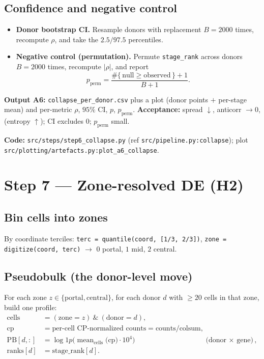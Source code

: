 \documentclass[11pt]{article}
\newcommand{\code}[1]{\texttt{\small #1}}
\begin{document}
\subsection{Confidence and negative control}
\begin{itemize}[leftmargin=1.4em]
  \item \textbf{Donor bootstrap CI.} Resample donors with replacement $B = 2000$ times, recompute
        $\rho$, and take the $2.5 / 97.5$ percentiles.
  \item \textbf{Negative control (permutation).} Permute \code{stage\_rank} across donors $B = 2000$
        times, recompute $|\rho|$, and report
        \[
          p_{\text{perm}} = \frac{\#\{\,\text{null} \ge \text{observed}\,\} + 1}{B + 1}.
        \]
\end{itemize}

\textbf{Output A6:} \code{collapse\_per\_donor.csv} plus a plot (donor points $+$ per-stage mean)
and per-metric $\rho$, $95\%$ CI, $p$, $p_{\text{perm}}$.
\textbf{Acceptance:} spread $\downarrow$, anticorr $\to 0$, (entropy $\uparrow$); CI excludes $0$;
$p_{\text{perm}}$ small.

\medskip
\noindent\textbf{Code:} \code{src/steps/step6\_collapse.py} (ref \code{src/pipeline.py:collapse});
plot \code{src/plotting/artefacts.py:plot\_a6\_collapse}.

\section{Step 7 --- Zone-resolved DE (H2)}

\subsection{Bin cells into zones}
By coordinate terciles: \code{terc = quantile(coord, [1/3, 2/3])},
\code{zone = digitize(coord, terc)} $\rightarrow$ $0$ portal, $1$ mid, $2$ central.

\subsection{Pseudobulk (the donor-level move)}
For each zone $z \in \{\text{portal}, \text{central}\}$, for each donor $d$ with $\ge 20$ cells in
that zone, build one profile:
\begin{align}
  \text{cells}  &= (\text{zone}=z)\ \&\ (\text{donor}=d), \\
  \text{cp}     &= \text{per-cell CP-normalized counts} = \text{counts} / \text{colsum}, \\
  \text{PB}[d,:] &= \log\!1p\!\Big(\operatorname{mean}_{\text{cells}}\big(\text{cp}\big) \cdot 10^4\Big)
                    && \text{(donor $\times$ gene)}, \\
  \text{ranks}[d] &= \text{stage\_rank}[d].
\end{align}
\end{document}
